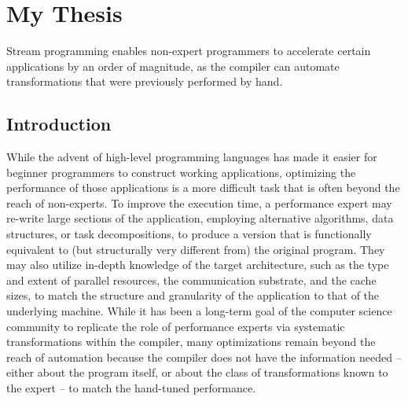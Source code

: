 \chapter{My Thesis}


Stream programming enables non-expert programmers to accelerate
certain applications by an order of magnitude, as the compiler can
automate transformations that were previously performed by hand.

\section{Introduction}

While the advent of high-level programming languages has made it
easier for beginner programmers to construct working applications,
optimizing the performance of those applications is a more difficult
task that is often beyond the reach of non-experts.  To improve the
execution time, a performance expert may re-write large sections of
the application, employing alternative algorithms, data structures, or
task decompositions, to produce a version that is functionally
equivalent to (but structurally very different from) the original
program.  They may also utilize in-depth knowledge of the target
architecture, such as the type and extent of parallel resources, the
communication substrate, and the cache sizes, to match the structure
and granularity of the application to that of the underlying machine.
While it has been a long-term goal of the computer science community
to replicate the role of performance experts via systematic
transformations within the compiler, many optimizations remain beyond
the reach of automation because the compiler does not have the
information needed -- either about the program itself, or about the
class of transformations known to the expert -- to match the
hand-tuned performance.

